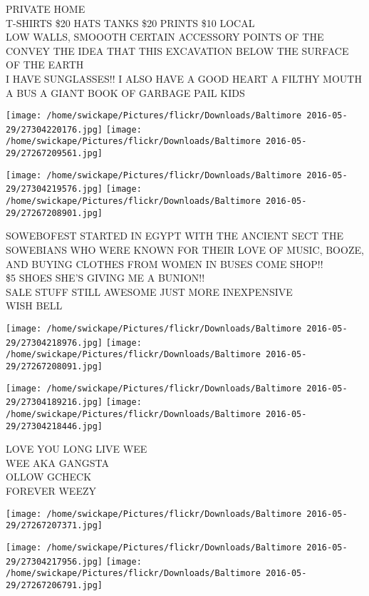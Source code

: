 \documentclass[10pt,letterpaper]{article}
\begin{document}
PRIVATE HOME\\
T{-}SHIRTS \$20 HATS TANKS \$20 PRINTS \$10 LOCAL\\
LOW WALLS, SMOOOTH CERTAIN ACCESSORY POINTS OF THE CONVEY THE IDEA THAT THIS EXCAVATION BELOW THE SURFACE OF THE EARTH\\
I HAVE SUNGLASSES!!  I ALSO HAVE A GOOD HEART A FILTHY MOUTH A BUS A GIANT BOOK OF GARBAGE PAIL KIDS\\
\pagebreak

\texttt{[image: /home/swickape/Pictures/flickr/Downloads/Baltimore 2016-05-29/27304220176.jpg]}
\texttt{[image: /home/swickape/Pictures/flickr/Downloads/Baltimore 2016-05-29/27267209561.jpg]}

\texttt{[image: /home/swickape/Pictures/flickr/Downloads/Baltimore 2016-05-29/27304219576.jpg]}
\texttt{[image: /home/swickape/Pictures/flickr/Downloads/Baltimore 2016-05-29/27267208901.jpg]}

SOWEBOFEST STARTED IN EGYPT WITH THE ANCIENT SECT THE SOWEBIANS WHO WERE KNOWN FOR THEIR LOVE OF MUSIC, BOOZE, AND BUYING CLOTHES FROM WOMEN IN BUSES COME SHOP!!\\
\$5 SHOES SHE'S GIVING ME A BUNION!!\\
SALE STUFF STILL AWESOME JUST MORE INEXPENSIVE\\
WISH BELL\\
\pagebreak

\texttt{[image: /home/swickape/Pictures/flickr/Downloads/Baltimore 2016-05-29/27304218976.jpg]}
\texttt{[image: /home/swickape/Pictures/flickr/Downloads/Baltimore 2016-05-29/27267208091.jpg]}

\texttt{[image: /home/swickape/Pictures/flickr/Downloads/Baltimore 2016-05-29/27304189216.jpg]}
\texttt{[image: /home/swickape/Pictures/flickr/Downloads/Baltimore 2016-05-29/27304218446.jpg]}

LOVE YOU LONG LIVE WEE\\
WEE AKA GANGSTA\\
OLLOW GCHECK\\
FOREVER WEEZY\\
\pagebreak

\texttt{[image: /home/swickape/Pictures/flickr/Downloads/Baltimore 2016-05-29/27267207371.jpg]}

\vspace{0.25in}
\texttt{[image: /home/swickape/Pictures/flickr/Downloads/Baltimore 2016-05-29/27304217956.jpg]}
\texttt{[image: /home/swickape/Pictures/flickr/Downloads/Baltimore 2016-05-29/27267206791.jpg]}
\end{document}
